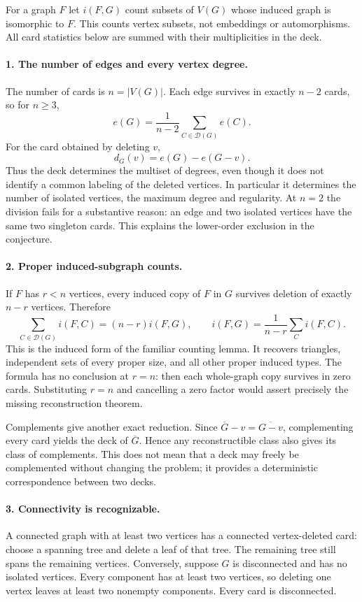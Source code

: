 \documentclass[11pt]{article}
\begin{document}
For a graph $F$ let $i(F,G)$ count subsets of $V(G)$ whose induced graph is isomorphic to $F$. This counts vertex subsets, not embeddings or automorphisms. All card statistics below are summed with their multiplicities in the deck.

\paragraph{1. The number of edges and every vertex degree.}
The number of cards is $n=|V(G)|$. Each edge survives in exactly $n-2$ cards, so for $n\ge3$,
\[
 e(G)=\frac1{n-2}\sum_{C\in\mathcal D(G)}e(C).
\]
For the card obtained by deleting $v$,
\[
 d_G(v)=e(G)-e(G-v).
\]
Thus the deck determines the multiset of degrees, even though it does not identify a common labeling of the deleted vertices. In particular it determines the number of isolated vertices, the maximum degree and regularity. At $n=2$ the division fails for a substantive reason: an edge and two isolated vertices have the same two singleton cards. This explains the lower-order exclusion in the conjecture.

\paragraph{2. Proper induced-subgraph counts.}
If $F$ has $r<n$ vertices, every induced copy of $F$ in $G$ survives deletion of exactly $n-r$ vertices. Therefore
\[
 \sum_{C\in\mathcal D(G)}i(F,C)=(n-r)i(F,G),
 \qquad
 i(F,G)=\frac1{n-r}\sum_C i(F,C).
\]
This is the induced form of the familiar counting lemma. It recovers triangles, independent sets of every proper size, and all other proper induced types. The formula has no conclusion at $r=n$: then each whole-graph copy survives in zero cards. Substituting $r=n$ and cancelling a zero factor would assert precisely the missing reconstruction theorem.

Complements give another exact reduction. Since $\overline{G}-v=\overline{G-v}$, complementing every card yields the deck of $\overline G$. Hence any reconstructible class also gives its class of complements. This does not mean that a deck may freely be complemented without changing the problem; it provides a deterministic correspondence between two decks.

\paragraph{3. Connectivity is recognizable.}
A connected graph with at least two vertices has a connected vertex-deleted card: choose a spanning tree and delete a leaf of that tree. The remaining tree still spans the remaining vertices. Conversely, suppose $G$ is disconnected and has no isolated vertices. Every component has at least two vertices, so deleting one vertex leaves at least two nonempty components. Every card is disconnected.
\end{document}
